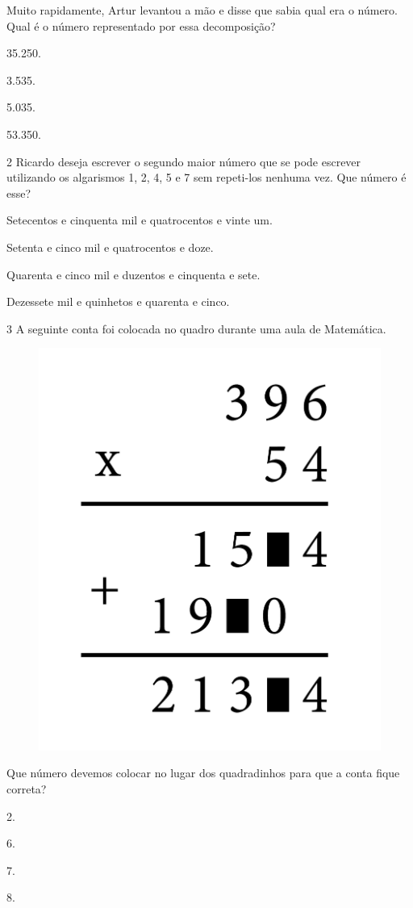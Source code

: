Muito rapidamente, Artur levantou a mão e disse que sabia qual era o
número. Qual é o número representado por essa decomposição?

\begin{escolha}
\item
  35.250.
\item
  3.535.
\item
  5.035.
\item
  53.350.
\end{escolha}


\num{2} Ricardo deseja escrever o segundo maior número que se pode escrever
utilizando os algarismos 1, 2, 4, 5 e 7 sem repeti-los nenhuma vez.
Que número é esse?

\begin{escolha}
\item
  Setecentos e cinquenta mil e quatrocentos e vinte um.
\item
  Setenta e cinco mil e quatrocentos e doze.
\item
  Quarenta e cinco mil e duzentos e cinquenta e sete.
\item
  Dezessete mil e quinhetos e quarenta e cinco.
\end{escolha}


\num{3} A seguinte conta foi colocada no quadro durante uma aula de Matemática.

\begin{figure}[htpb!]
\centering
\includegraphics[width=.25\textwidth]{media/image83.png}
\end{figure}

\pagebreak
Que número devemos colocar no lugar dos quadradinhos para que a conta
fique correta?

\begin{multicols}{2}
\begin{escolha}
\item
  2.
\item
  6.
\item
  7.
\item
  8.
\end{escolha}
\end{multicols}

